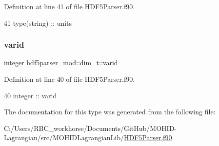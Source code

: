 Definition at line 41 of file H\+D\+F5\+Parser.\+f90.


\begin{DoxyCode}
41         type(string) :: units
\end{DoxyCode}
\mbox{\label{structhdf5parser__mod_1_1dim__t_a19157b960547496c13ee1e993bb4e45b}} 
\subsubsection{\texorpdfstring{varid}{varid}}
{\footnotesize\ttfamily integer hdf5parser\+\_\+mod\+::dim\+\_\+t\+::varid\hspace{0.3cm}{\ttfamily [private]}}



Definition at line 40 of file H\+D\+F5\+Parser.\+f90.


\begin{DoxyCode}
40         \textcolor{keywordtype}{integer} :: varid
\end{DoxyCode}


The documentation for this type was generated from the following file\+:\begin{DoxyCompactItemize}
\item 
C\+:/\+Users/\+R\+B\+C\+\_\+workhorse/\+Documents/\+Git\+Hub/\+M\+O\+H\+I\+D-\/\+Lagrangian/src/\+M\+O\+H\+I\+D\+Lagrangian\+Lib/\mbox{\hyperlink{_h_d_f5_parser_8f90}{H\+D\+F5\+Parser.\+f90}}\end{DoxyCompactItemize}

